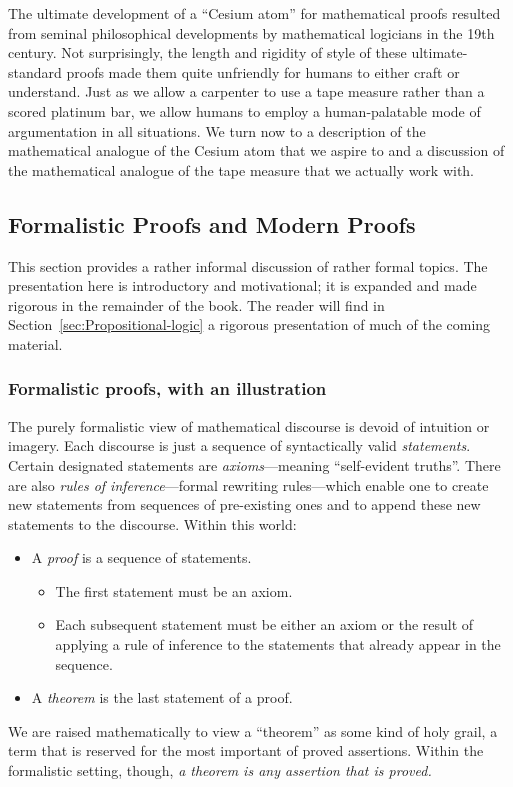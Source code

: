 The ultimate development of a ``Cesium atom'' for mathematical proofs resulted from seminal philosophical developments by mathematical logicians in the 19th century.  Not surprisingly, the length and rigidity of style of these ultimate-standard proofs made them quite unfriendly for humans to either craft or understand.  Just as we allow a carpenter to use a tape measure rather than a scored platinum bar, we allow humans to employ a human-palatable mode of argumentation in all situations.  We turn now to a description of the mathematical analogue of the Cesium atom that we aspire to and a discussion of the mathematical analogue of the tape measure that we actually work with.


\subsection{Formalistic Proofs and Modern Proofs}
\label{sec:classical-v-modern-proofs}

This section provides a rather informal discussion of rather formal topics.  The presentation here is introductory and motivational; it is expanded and made rigorous in the remainder of the book.  The reader will find in Section~\ref{sec:Propositional-logic} a rigorous presentation of much of the coming material.

\subsubsection{Formalistic proofs, with an illustration}
\label{sec:formal-proof}

The purely formalistic view of mathematical discourse is devoid of intuition or imagery.  Each discourse is just a sequence of syntactically valid {\it statements}.  Certain designated statements are {\em axioms}---meaning ``self-evident truths''.  There are also {\em rules of inference}---formal rewriting rules---which enable one to create new statements from sequences of pre-existing ones and to append these new statements to the discourse.  Within this world:
\begin{itemize}
\item
A {\em proof} is a sequence of statements.
  \begin{itemize}
  \item
The first statement must be an axiom.
  \medskip\item
Each subsequent statement must be either an axiom or the result of applying a rule of inference to the statements that already appear in the sequence.
  \end{itemize}
\medskip\item
A {\em theorem} is the last statement of a proof.
\end{itemize}
We are raised mathematically to view a ``theorem'' as some kind of holy grail, a term that is reserved for the most important of proved assertions.  Within the formalistic setting, though, {\em a theorem is any assertion that is proved.}

